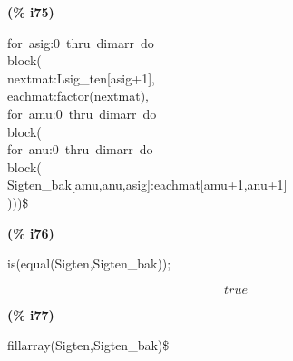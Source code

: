 \documentclass[fleqn]{article}
\begin{document}
\noindent%



\noindent
\begin{minipage}[t]{4.000000em}\color{red}\bfseries
(\% i75)	
\end{minipage}
\begin{minipage}[t]{\textwidth}\color{blue}
for\ asig:0\ thru\ dimarr\ do\\
block(\\
nextmat:Lsig\_ten[asig+1],\\
eachmat:factor(nextmat),\\
for\ amu:0\ thru\ dimarr\ do\\
block(\\
for\ anu:0\ thru\ dimarr\ do\\
block(\\
Sigten\_bak[amu,anu,asig]:eachmat[amu+1,anu+1]\\
)))\$
\end{minipage}

\noindent%



\noindent
\begin{minipage}[t]{4.000000em}\color{red}\bfseries
(\% i76)	
\end{minipage}
\begin{minipage}[t]{\textwidth}\color{blue}
is(equal(Sigten,Sigten\_bak));
\end{minipage}
\[\displaystyle \tag{\% o76} 
true\mbox{}
\]


\noindent
\begin{minipage}[t]{4.000000em}\color{red}\bfseries
(\% i77)	
\end{minipage}
\begin{minipage}[t]{\textwidth}\color{blue}
fillarray(Sigten,Sigten\_bak)\$
\end{minipage}

\noindent%
\end{document}
